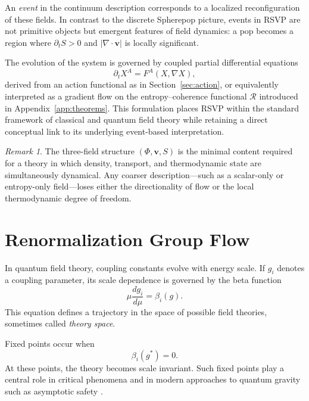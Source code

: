 \documentclass[12pt,a4paper]{article}
\theoremstyle{plain}
\theoremstyle{definition}
\theoremstyle{remark}
\newtheorem{remark}{Remark}
\begin{document}
An \emph{event} in the continuum description corresponds to a localized
reconfiguration of these fields. In contrast to the discrete Spherepop
picture, events in RSVP are not primitive objects but emergent features
of field dynamics: a pop becomes a region where $\partial_t S > 0$ and
$|\nabla \cdot \mathbf{v}|$ is locally significant.

The evolution of the system is governed by coupled partial differential
equations
\begin{equation}
\partial_t X^A = F^A(X, \nabla X),
\end{equation}
derived from an action functional as in
Section~\ref{sec:action}, or equivalently interpreted as a gradient
flow on the entropy--coherence functional $\mathcal{R}$ introduced in
Appendix~\ref{app:theorems}. This formulation places RSVP within the
standard framework of classical and quantum field theory while
retaining a direct conceptual link to its underlying event-based
interpretation.

\begin{remark}
The three-field structure $(\Phi,\mathbf{v},S)$ is the minimal content
required for a theory in which density, transport, and thermodynamic
state are simultaneously dynamical. Any coarser description---such as
a scalar-only or entropy-only field---loses either the directionality
of flow or the local thermodynamic degree of freedom.
\end{remark}

\section{Renormalization Group Flow}

In quantum field theory, coupling constants evolve with energy scale.
If $g_i$ denotes a coupling parameter, its scale dependence is governed
by the beta function \cite{Wilson1974,Callan1970,Polchinski1984}
\begin{equation}
\mu \frac{d g_i}{d\mu} = \beta_i(g).
\end{equation}
This equation defines a trajectory in the space of possible field
theories, sometimes called \emph{theory space}.

Fixed points occur when
\begin{equation}
\beta_i(g^\ast) = 0.
\end{equation}
At these points, the theory becomes scale invariant. Such fixed points
play a central role in critical phenomena \cite{Fisher1998} and in
modern approaches to quantum gravity such as asymptotic safety
\cite{Weinberg1979,Reuter1998}.
\end{document}

